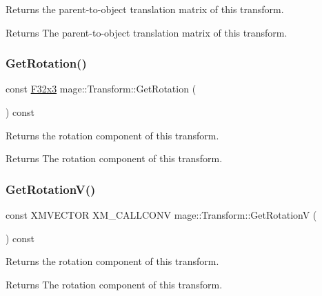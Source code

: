Returns the parent-\/to-\/object translation matrix of this transform.

\begin{DoxyReturn}{Returns}
The parent-\/to-\/object translation matrix of this transform. 
\end{DoxyReturn}
\hypertarget{classmage_1_1_transform_a693bc4ac41f3690122344054cc4b64b2}{}\label{classmage_1_1_transform_a693bc4ac41f3690122344054cc4b64b2} 
\subsubsection{\texorpdfstring{Get\+Rotation()}{GetRotation()}}
{\footnotesize\ttfamily const \hyperlink{namespacemage_a73fbe0da4b8d5bc156bb8453e5b63a17}{F32x3} mage\+::\+Transform\+::\+Get\+Rotation (\begin{DoxyParamCaption}{ }\end{DoxyParamCaption}) const\hspace{0.3cm}{\ttfamily [noexcept]}}

Returns the rotation component of this transform.

\begin{DoxyReturn}{Returns}
The rotation component of this transform. 
\end{DoxyReturn}
\hypertarget{classmage_1_1_transform_af402e4f2aebed389ca77802fe7ff766b}{}\label{classmage_1_1_transform_af402e4f2aebed389ca77802fe7ff766b} 
\subsubsection{\texorpdfstring{Get\+Rotation\+V()}{GetRotationV()}}
{\footnotesize\ttfamily const X\+M\+V\+E\+C\+T\+OR X\+M\+\_\+\+C\+A\+L\+L\+C\+O\+NV mage\+::\+Transform\+::\+Get\+RotationV (\begin{DoxyParamCaption}{ }\end{DoxyParamCaption}) const\hspace{0.3cm}{\ttfamily [noexcept]}}

Returns the rotation component of this transform.

\begin{DoxyReturn}{Returns}
The rotation component of this transform. 
\end{DoxyReturn}
\hypertarget{classmage_1_1_transform_ad3e1b49ccac234303ff28c8aea6f8e4a}{}\label{classmage_1_1_transform_ad3e1b49ccac234303ff28c8aea6f8e4a} 
